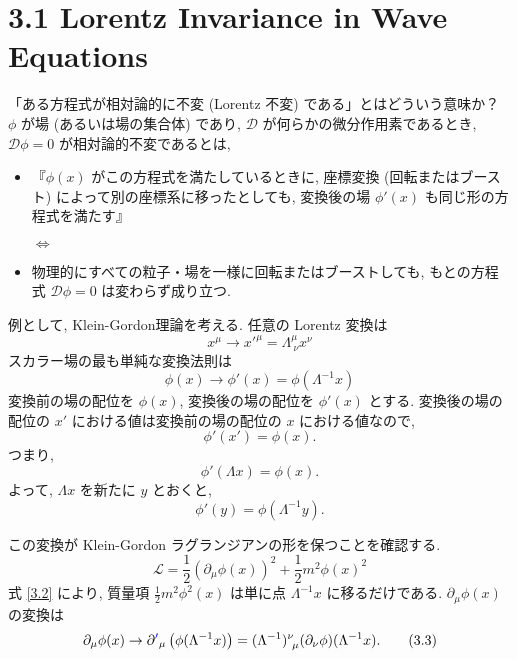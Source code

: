 \documentclass[a4paper,12pt]{article}
\begin{document}
\section*{3.1 Lorentz Invariance in Wave Equations}
「ある方程式が相対論的に不変 (Lorentz 不変) である」とはどういう意味か？\\
$\phi$ が場 (あるいは場の集合体) であり, $\mathcal{D}$ が何らかの微分作用素であるとき, $\mathcal{D}\phi = 0$ が相対論的不変であるとは, 
\begin{itemize}
    \item『$\phi(x)$ がこの方程式を満たしているときに, 座標変換 (回転またはブースト) によって別の座標系に移ったとしても, 変換後の場 $\phi'(x)$ も同じ形の方程式を満たす』

\hspace{2cm}$\Longleftrightarrow$

    \item 物理的にすべての粒子・場を一様に回転またはブーストしても, もとの方程式 $\mathcal{D}\phi = 0$ は変わらず成り立つ.
\end{itemize}
例として, Klein-Gordon理論を考える. 任意の Lorentz 変換は
\begin{equation*}
x^\mu \to x'^\mu = \Lambda^\mu_{\ \nu} x^\nu \tag{3.1}
\end{equation*}
スカラー場の最も単純な変換法則は
\begin{equation*}
\phi(x) \to \phi'(x) = \phi(\Lambda^{-1} x) \label{3.2}\tag{3.2}
\end{equation*}
\color{blue}
変換前の場の配位を $\phi(x)$, 変換後の場の配位を $\phi'(x)$ とする. 変換後の場の配位の $x'$ における値は変換前の場の配位の $x$ における値なので,
\begin{equation*}
  \phi'(x') = \phi(x). \tag{3-1.a1}
\end{equation*}
つまり,
\begin{equation*}
  \phi'(\Lambda x) = \phi(x). \tag{3-1.a2}
\end{equation*}
よって, $\Lambda x$ を新たに $y$ とおくと,
\begin{equation*}
  \phi'(y) = \phi(\Lambda^{-1}y). \tag{3-1.a3}
\end{equation*}





\color{black}

この変換が Klein-Gordon ラグランジアンの形を保つことを確認する.
\begin{equation*}
  \mathcal{L} = \frac{1}{2}(\partial_\mu \phi(x))^2 + \frac{1}{2}m^2\phi(x)^2
\end{equation*}
式 \eqref{3.2} により, 質量項 $\frac{1}{2} m^2 \phi^2(x)$ は単に点 $\Lambda^{-1}x$ に移るだけである. $\partial_\mu \phi(x)$ の変換は
\begin{equation*}
\partial_\mu \phi(x) \rightarrow \partial{\textcolor{blue}{'}}_\mu \left( \phi(\Lambda^{-1}x) \right) = (\Lambda^{-1})^\nu_{\ \mu} (\partial_\nu \phi)(\Lambda^{-1}x). \label{3.3}\tag{3.3}
\end{equation*}
\end{document}
